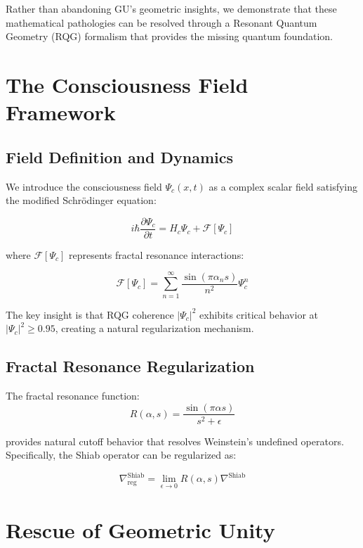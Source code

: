 \documentclass[12pt]{article}
\begin{document}
Rather than abandoning GU's geometric insights, we demonstrate that these mathematical pathologies can be resolved through a Resonant Quantum Geometry (RQG) formalism that provides the missing quantum foundation.

\section{The Consciousness Field Framework}

\subsection{Field Definition and Dynamics}

We introduce the consciousness field $\Psi_c(x,t)$ as a complex scalar field satisfying the modified Schrödinger equation:

\begin{equation}
i\hbar \frac{\partial \Psi_c}{\partial t} = H_c \Psi_c + \mathcal{F}[\Psi_c]
\end{equation}

where $\mathcal{F}[\Psi_c]$ represents fractal resonance interactions:

\begin{equation}
\mathcal{F}[\Psi_c] = \sum_{n=1}^{\infty} \frac{\sin(\pi \alpha_n s)}{n^2} \Psi_c^n
\end{equation}

The key insight is that RQG coherence $|\Psi_c|^2$ exhibits critical behavior at $|\Psi_c|^2 \geq 0.95$, creating a natural regularization mechanism.

\subsection{Fractal Resonance Regularization}

The fractal resonance function:
\begin{equation}
R(\alpha, s) = \frac{\sin(\pi \alpha s)}{s^2 + \epsilon}
\end{equation}

provides natural cutoff behavior that resolves Weinstein's undefined operators. Specifically, the Shiab operator can be regularized as:

\begin{equation}
\nabla^{\text{Shiab}}_{\text{reg}} = \lim_{\epsilon \to 0} R(\alpha, s) \nabla^{\text{Shiab}}
\end{equation}

\section{Rescue of Geometric Unity}
\end{document}
